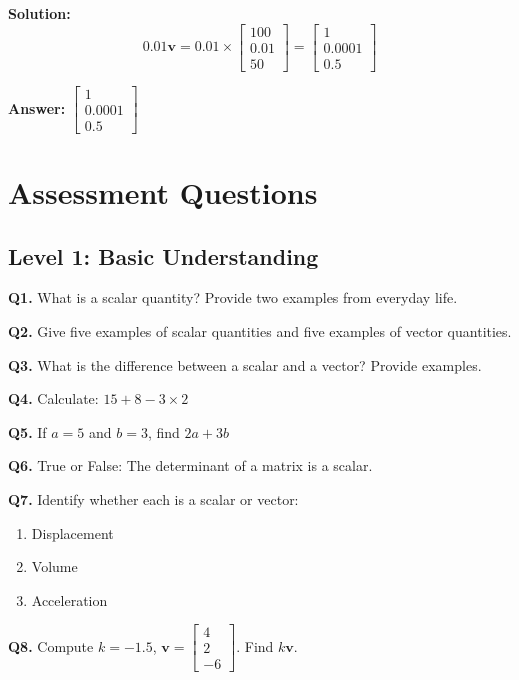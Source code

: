 \documentclass[11pt,a4paper]{article}
\begin{document}
\textbf{Solution:}
\begin{equation}
    0.01\mathbf{v} = 0.01 \times \begin{bmatrix} 100 \\ 0.01 \\ 50 \end{bmatrix} = \begin{bmatrix} 1 \\ 0.0001 \\ 0.5 \end{bmatrix}
\end{equation}

\textbf{Answer:} $\begin{bmatrix} 1 \\ 0.0001 \\ 0.5 \end{bmatrix}$

\section{Assessment Questions}

\subsection{Level 1: Basic Understanding}

\textbf{Q1.} What is a scalar quantity? Provide two examples from everyday life.

\textbf{Q2.} Give five examples of scalar quantities and five examples of vector quantities.

\textbf{Q3.} What is the difference between a scalar and a vector? Provide examples.

\textbf{Q4.} Calculate: $15 + 8 - 3 \times 2$

\textbf{Q5.} If $a = 5$ and $b = 3$, find $2a + 3b$

\textbf{Q6.} True or False: The determinant of a matrix is a scalar.

\textbf{Q7.} Identify whether each is a scalar or vector:
\begin{enumerate}[label=(\alph*)]
    \item Displacement
    \item Volume
    \item Acceleration
\end{enumerate}

\textbf{Q8.} Compute $k = -1.5$, $\mathbf{v} = \begin{bmatrix} 4 \\ 2 \\ -6 \end{bmatrix}$. Find $k\mathbf{v}$.
\end{document}
